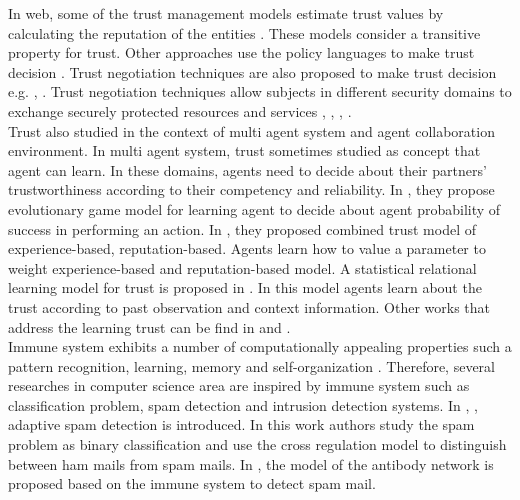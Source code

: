\documentclass{llncs}
\begin{document}
In web, some of the trust management models estimate trust values by calculating the reputation of the entities \cite{reputationWeb}. These models consider a transitive property for trust.  Other approaches  use the policy languages to make trust decision \cite{trustpolicy}.  Trust negotiation techniques are also proposed to make trust decision e.g. \cite{Winslett}, \cite{Winslett2}. Trust negotiation techniques allow subjects in different security domains to exchange securely protected resources and services \cite{Squicciarini}, \cite{Koshutanski}, \cite{Winsborough}, \cite{Winsborough2}. \\

Trust also studied in the context of multi agent system and agent collaboration environment. In multi agent system, trust sometimes studied as concept that agent can learn. In these domains, agents need to decide about their partners’ trustworthiness according to their competency and reliability.  In \cite{competent}, they propose evolutionary game model for learning agent
to decide about agent probability of success in performing an action. In \cite{experince}, they proposed combined trust model of experience-based, reputation-based. Agents learn how to value a parameter to weight experience-based and reputation-based model.  A statistical relational learning model for trust is proposed in \cite{statistical}. In this model agents learn about the trust according to past observation and context information. 
Other works that address the learning trust can be find in \cite{inittrust} and \cite{taskspecific}.\\

Immune system exhibits a number of computationally appealing properties such a pattern recognition, learning, memory and self-organization \cite{aisLearning}. Therefore, several researches in computer science area are inspired by immune system such as classification problem, spam detection and intrusion detection systems.  In \cite{Al1}, \cite{Al2}, adaptive spam detection is introduced. In this work authors study the spam problem as binary classification and use the cross regulation model to distinguish between ham mails from spam mails. In \cite{spam}, the model of the antibody network is proposed based on the immune system to detect spam mail. 
\end{document}
